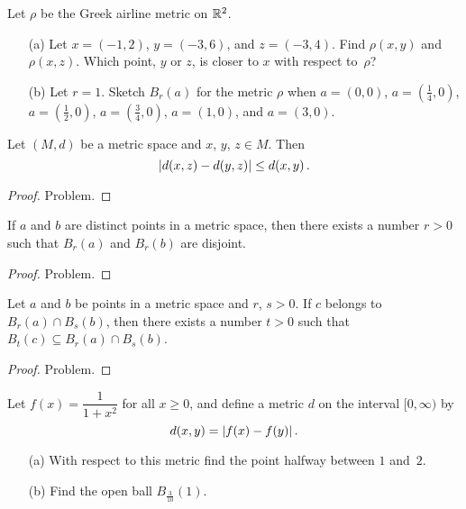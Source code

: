 \begin{prob} Let $\rho$ be the Greek airline metric on $\mathbb{R}^2$.
 \begin{enumerate}
  \item[(a)] Let $x = (-1,2)$, $y = (-3,6)$, and $z = (-3,4)$. Find $\rho(x,y)$ and $\rho(x,z)$.
Which point, $y$ or $z$, is closer to $x$ with respect to~$\rho$?
  \item[(b)] Let $r = 1$. Sketch $B_r(a)$ for the metric $\rho$ when $a = (0,0)$, $a = (\frac14,0)$,
$a = (\frac12,0)$, $a = (\frac34,0)$, $a = (1,0)$, and $a = (3,0)$.
 \end{enumerate}
\end{prob}

\begin{prop}\label{ms_ineq} Let $(M,d)$ be a metric space and $x$, $y$, $z \in M$. Then
   \[ \lvert d(x,z) - d(y,z)\rvert \le d(x,y)\,. \]
\end{prop}

\begin{proof} Problem.  \ns  \end{proof}

\begin{prop} If $a$ and $b$ are distinct points in a metric space, then there exists a number
$r > 0$ such that $B_r(a)$ and $B_r(b)$ are disjoint.
\end{prop}

\begin{proof} Problem. \ns  \end{proof}

\begin{prop}\label{ball_int} Let $a$ and $b$ be points in a metric space and $r$, $s > 0$.
If $c$ belongs to $B_r(a) \cap B_s(b)$, then there exists a number $t > 0$ such that $B_t(c)
\subseteq B_r(a) \cap B_s(b)$.
\end{prop}

\begin{proof} Problem. \ns  \end{proof}

\begin{prob} Let $f(x) = \dfrac 1{1+x^2}$ for all $x \ge 0$, and define a metric $d$ on the
interval $[0,\infty)$ by
  \[ d(x,y) = \lvert f(x) - f(y)\rvert\,. \]
 \begin{enumerate}
  \item[(a)] With respect to this metric find the point halfway between $1$ and~$2$.
  \item[(b)] Find the open ball $B_{\frac3{10}}(1)$.
 \end{enumerate}
\end{prob}








